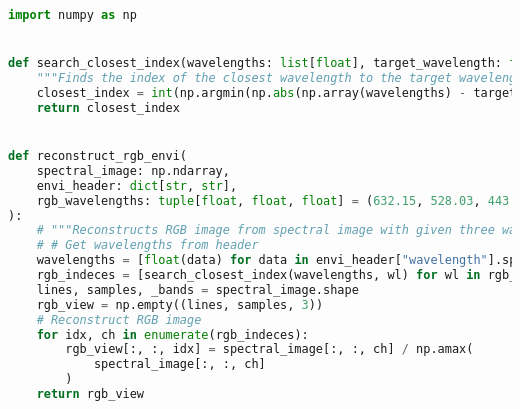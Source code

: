 \begin{lstlisting}[language=python, caption=Make RGB preview from given specral image, label={code:rgb-preview}]
import numpy as np


def search_closest_index(wavelengths: list[float], target_wavelength: float) -> int:
    """Finds the index of the closest wavelength to the target wavelength from value of envi header."""
    closest_index = int(np.argmin(np.abs(np.array(wavelengths) - target_wavelength)))
    return closest_index


def reconstruct_rgb_envi(
    spectral_image: np.ndarray,
    envi_header: dict[str, str],
    rgb_wavelengths: tuple[float, float, float] = (632.15, 528.03, 443.56),
):
    # """Reconstructs RGB image from spectral image with given three wavelengths."""
    # # Get wavelengths from header
    wavelengths = [float(data) for data in envi_header["wavelength"].split(",")]
    rgb_indeces = [search_closest_index(wavelengths, wl) for wl in rgb_wavelengths]
    lines, samples, _bands = spectral_image.shape
    rgb_view = np.empty((lines, samples, 3))
    # Reconstruct RGB image
    for idx, ch in enumerate(rgb_indeces):
        rgb_view[:, :, idx] = spectral_image[:, :, ch] / np.amax(
            spectral_image[:, :, ch]
        )
    return rgb_view

\end{lstlisting}